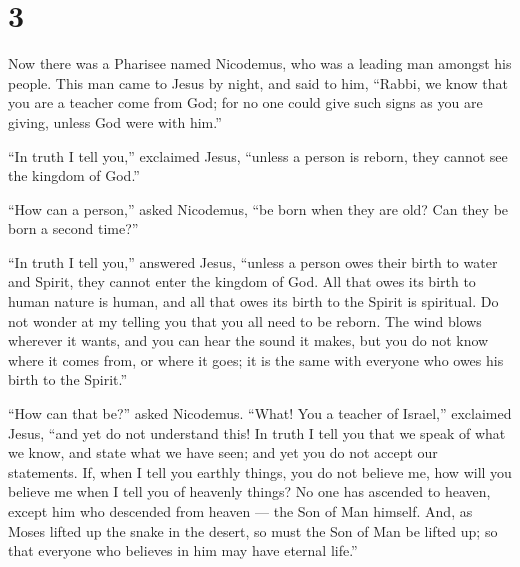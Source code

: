\hypertarget{section-2}{%
\section{3}\label{section-2}}

 Now there was a Pharisee named Nicodemus, who was a leading
man amongst his people.  This man came to Jesus by night,
and said to him, ``Rabbi, we know that you are a teacher come from God;
for no one could give such signs as you are giving, unless God were with
him.''

 ``In truth I tell you,'' exclaimed Jesus, ``unless a person
is reborn, they cannot see the kingdom of God.''

 ``How can a person,'' asked Nicodemus, ``be born when they
are old? Can they be born a second time?''

 ``In truth I tell you,'' answered Jesus, ``unless a person
owes their birth to water and Spirit, they cannot enter the kingdom of
God.  All that owes its birth to human nature is human, and
all that owes its birth to the Spirit is spiritual.  Do not
wonder at my telling you that you all need to be reborn. 
The wind blows wherever it wants, and you can hear the sound it makes,
but you do not know where it comes from, or where it goes; it is the
same with everyone who owes his birth to the Spirit.''

 ``How can that be?'' asked Nicodemus.  ``What!
You a teacher of Israel,'' exclaimed Jesus, ``and yet do not understand
this!  In truth I tell you that we speak of what we know,
and state what we have seen; and yet you do not accept our statements.
 If, when I tell you earthly things, you do not believe me,
how will you believe me when I tell you of heavenly things?
 No one has ascended to heaven, except him who descended
from heaven --- the Son of Man himself.  And, as Moses
lifted up the snake in the desert, so must the Son of Man be lifted up;
 so that everyone who believes in him may have eternal
life.''


